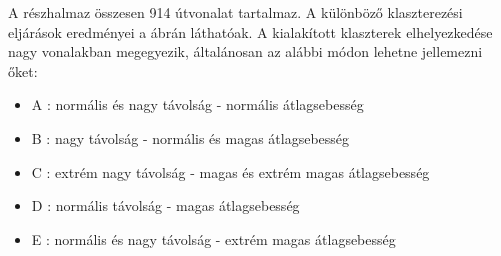 A részhalmaz összesen 914 útvonalat tartalmaz. A különböző klaszterezési eljárások eredményei a  ábrán láthatóak. A kialakított klaszterek elhelyezkedése nagy vonalakban megegyezik, általánosan az alábbi módon lehetne jellemezni őket:
\begin{itemize}
	\item A : normális és nagy távolság - normális átlagsebesség
	\item B : nagy távolság - normális és magas átlagsebesség
	\item C : extrém nagy távolság - magas és extrém magas átlagsebesség
	\item D : normális távolság - magas átlagsebesség
	\item E : normális és nagy távolság - extrém magas átlagsebesség
\end{itemize}

